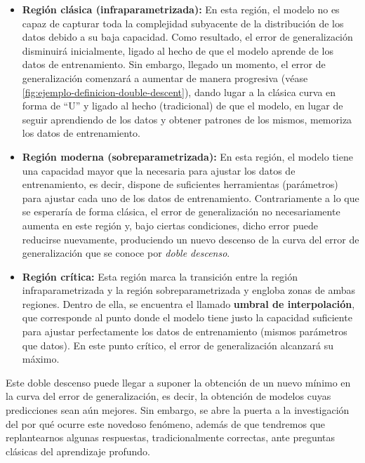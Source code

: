 \begin{itemize}
    \item \textbf{Región clásica (infraparametrizada):} En esta región, el modelo no es capaz de capturar toda la complejidad subyacente de la distribución de los datos debido a su baja capacidad. Como resultado, el error de generalización disminuirá inicialmente, ligado al hecho de que el modelo aprende de los datos de entrenamiento. Sin embargo, llegado un momento, el error de generalización comenzará a aumentar de manera progresiva (véase \autoref{fig:ejemplo-definicion-double-descent}), dando lugar a la clásica curva en forma de ``U'' y ligado al hecho (tradicional) de que el modelo, en lugar de seguir aprendiendo de los datos y obtener patrones de los mismos, memoriza los datos de entrenamiento.

    \item \textbf{Región moderna (sobreparametrizada):} En esta región, el modelo tiene una capacidad mayor que la necesaria para ajustar los datos de entrenamiento, es decir, dispone de suficientes herramientas (parámetros) para ajustar cada uno de los datos de entrenamiento. Contrariamente a lo que se esperaría de forma clásica, el error de generalización no necesariamente aumenta en este región y, bajo ciertas condiciones, dicho error puede reducirse nuevamente, produciendo un nuevo descenso de la curva del error de generalización que se conoce por \emph{doble descenso}.
    
    \item \textbf{Región crítica:} Esta región marca la transición entre la región infraparametrizada y la región sobreparametrizada y engloba zonas de ambas regiones. Dentro de ella, se encuentra el llamado \textbf{umbral de interpolación}, que corresponde al punto donde el modelo tiene justo la capacidad suficiente para ajustar perfectamente los datos de entrenamiento (mismos parámetros que datos). En este punto crítico, el error de generalización alcanzará su máximo.\newline
       
\end{itemize}

Este doble descenso puede llegar a suponer la obtención de un nuevo mínimo en la curva del error de generalización, es decir, la obtención de modelos cuyas predicciones sean aún mejores. Sin embargo, se abre la puerta a la investigación del por qué ocurre este novedoso fenómeno, además de que tendremos que replantearnos algunas respuestas, tradicionalmente correctas, ante preguntas clásicas del aprendizaje profundo.\newline

